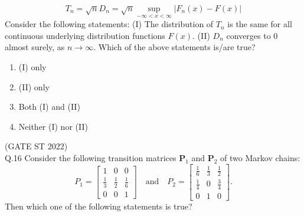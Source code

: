 \documentclass[journal,12pt,onecolumn]{IEEEtran}
\theoremstyle{remark}
\begin{document}
$$ T_n = \sqrt{n}D_n = \sqrt{n} \sup_{-\infty < x < \infty} | F_n(x) - F(x) | $$
Consider the following statements:
(I) The distribution of $T_n$ is the same for all continuous underlying distribution functions $F(x)$.
(II) $D_n$ converges to 0 almost surely, as $n \to \infty$.
Which of the above statements is/are true?
\begin{multicols}{4}
\begin{enumerate}[label=\alph*.] 
	\item (I) only
	\item (II) only
	\item Both (I) and (II)
	\item Neither (I) nor (II)
	
\end{enumerate}
\end{multicols}
\hfill (GATE ST 2022)\\
	\vspace{2em}
Q.16 Consider the following transition matrices $\textbf{P}_1$ and $\textbf{P}_2$ of two Markov chains:
\[
P_1 = 
\begin{bmatrix}
	1 & 0 & 0 \\
	\frac{1}{3} & \frac{1}{2} & \frac{1}{6} \\
	0 & 0 & 1
\end{bmatrix}
\quad \text{and} \quad
P_2 = 
\begin{bmatrix}
	\frac{1}{6} & \frac{1}{3} & \frac{1}{2} \\
	\frac{1}{4} & 0 & \frac{3}{4} \\
	0 & 1 & 0
\end{bmatrix}.
\]
Then which one of the following statements is true?
\end{document}
